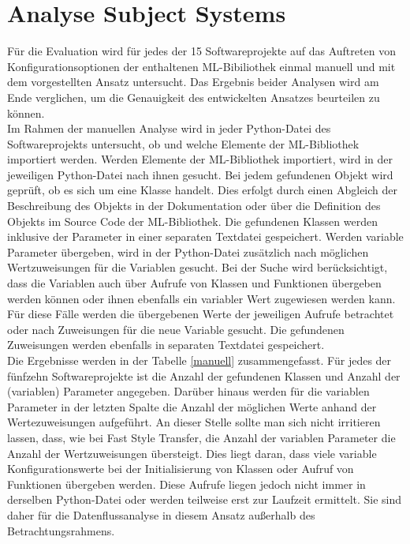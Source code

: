 \documentclass[german,bachelor]{swsLeipzig}
\begin{document}
\section{Analyse Subject Systems}
Für die Evaluation wird für jedes der 15 Softwareprojekte auf das Auftreten von Konfigurationsoptionen der enthaltenen ML-Bibiliothek
einmal manuell und mit dem vorgestellten Ansatz untersucht.
Das Ergebnis beider Analysen wird am Ende verglichen, um die Genauigkeit des entwickelten Ansatzes beurteilen zu können.\\
\indent Im Rahmen der manuellen Analyse wird in jeder Python-Datei des Softwareprojekts untersucht, ob und welche Elemente der ML-Bibliothek
importiert werden.
Werden Elemente der ML-Bibliothek importiert, wird in der jeweiligen Python-Datei nach ihnen gesucht.
Bei jedem gefundenen Objekt wird geprüft, ob es sich um eine Klasse handelt.
Dies erfolgt durch einen Abgleich der Beschreibung des Objekts in der Dokumentation oder
über die Definition des Objekts im Source Code der ML-Bibliothek.
Die gefundenen Klassen werden inklusive der Parameter in einer separaten Textdatei gespeichert.
Werden variable Parameter übergeben, wird in der Python-Datei zusätzlich nach möglichen Wertzuweisungen für die Variablen gesucht.
Bei der Suche wird berücksichtigt, dass die Variablen auch über Aufrufe von Klassen und Funktionen übergeben werden können oder ihnen ebenfalls ein
variabler Wert zugewiesen werden kann.
Für diese Fälle werden die übergebenen Werte der jeweiligen Aufrufe betrachtet oder nach Zuweisungen für die neue Variable gesucht.
Die gefundenen Zuweisungen werden ebenfalls in separaten Textdatei gespeichert.\\
\indent Die Ergebnisse werden in der Tabelle \ref{manuell} zusammengefasst.
Für jedes der fünfzehn Softwareprojekte ist die Anzahl der gefundenen Klassen und Anzahl der
(variablen) Parameter angegeben.
Darüber hinaus werden für die variablen Parameter in der letzten Spalte die Anzahl der möglichen Werte anhand
der Wertezuweisungen aufgeführt.
An dieser Stelle sollte man sich nicht irritieren lassen, dass, wie bei Fast Style Transfer, die Anzahl der variablen Parameter
die Anzahl der Wertzuweisungen übersteigt.
Dies liegt daran, dass viele variable Konfigurationswerte bei der Initialisierung von Klassen oder Aufruf von Funktionen
übergeben werden.
Diese Aufrufe liegen jedoch nicht immer in derselben Python-Datei oder werden teilweise erst zur Laufzeit ermittelt.
Sie sind daher für die Datenflussanalyse in diesem Ansatz außerhalb des Betrachtungsrahmens.
\end{document}
